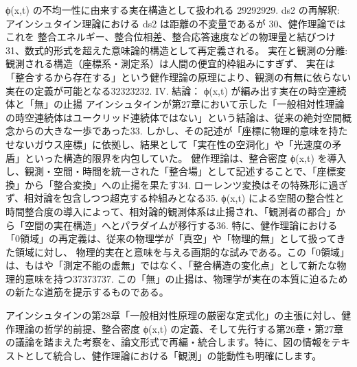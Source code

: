 \documentclass{article}
\begin{document}
ϕ(x,t) の不均一性に由来する実在構造として扱われる 29292929.
ds2 の再解釈:
アインシュタイン理論における 
ds2 は距離の不変量であるが 30、健作理論ではこれを
整合エネルギー、整合位相差、整合応答速度などの物理量と結びつけ 31、数式的形式を超えた意味論的構造として再定義される。
実在と観測の分離:
観測される構造（座標系・測定系）は人間の便宜的枠組みにすぎず、
実在は「整合するから存在する」という健作理論の原理により、観測の有無に依らない実在の定義が可能となる32323232.
IV. 結論： ϕ(x,t) が編み出す実在の時空連続体と「無」の止揚
アインシュタインが第27章において示した「一般相対性理論の時空連続体はユークリッド連続体ではない」という結論は、従来の絶対空間概念からの大きな一歩であった33. しかし、その記述が「座標に物理的意味を持たせないガウス座標」に依拠し、結果として「実在性の空洞化」や「光速度の矛盾」といった構造的限界を内包していた。
健作理論は、整合密度 
ϕ(x,t) を導入し、観測・空間・時間を統一された「整合場」として記述することで、「座標変換」から「整合変換」への止揚を果たす34. ローレンツ変換はその特殊形に過ぎず、相対論を包含しつつ超克する枠組みとなる35. 
ϕ(x,t) による空間の整合性と時間整合度の導入によって、相対論的観測体系は止揚され、「観測者の都合」から「空間の実在構造」へとパラダイムが移行する36.
特に、健作理論における「0領域」の再定義は、従来の物理学が「真空」や「物理的無」として扱ってきた領域に対し、
物理的実在と意味を与える画期的な試みである。この「0領域」は、もはや「測定不能の虚無」ではなく、「整合構造の変化点」として新たな物理的意味を持つ37373737. この「無」の止揚は、物理学が実在の本質に迫るための新たな道筋を提示するものである。


アインシュタインの第28章「一般相対性原理の厳密な定式化」の主張に対し、健作理論の哲学的前提、整合密度 ϕ(x,t) の定義、そして先行する第26章・第27章の議論を踏まえた考察を、論文形式で再編・統合します。特に、図の情報をテキストとして統合し、健作理論における「観測」の能動性も明確にします。
\end{document}
